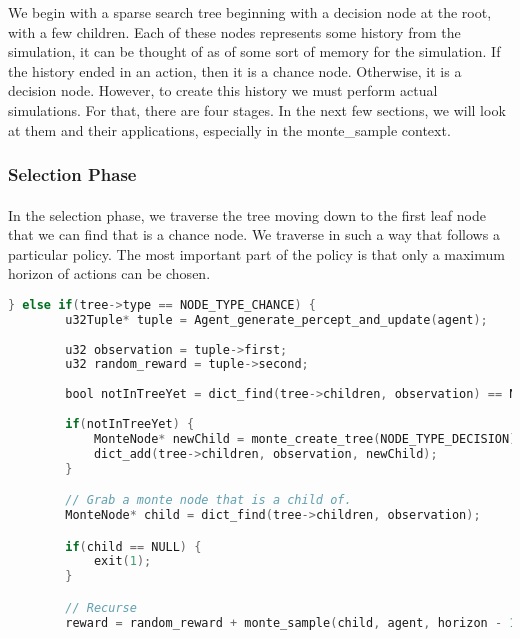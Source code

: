 \documentclass[fancychapters]{report}   	%
\begin{document}
We begin with a sparse search tree beginning with a decision node at the root, with a few children. Each of these nodes represents some history from the simulation, it can be thought of as of some sort of memory for the simulation. If the history ended in an action, then it is a chance node. Otherwise, it is a decision node. However, to create this history we must perform actual simulations. For that, there are four stages. In the next few sections, we will look at them and their applications, especially in the monte\_sample context.

\paragraph{}

\subsubsection{Selection Phase}

\paragraph{}In the selection phase, we traverse the tree moving down to the first leaf node that we can find that is a chance node. We traverse in such a way that follows a particular policy. The most important part of the policy is that only a maximum horizon of actions can be chosen.

\begin{lstlisting}[language=C, caption="Monte Sample"]
   } else if(tree->type == NODE_TYPE_CHANCE) {
        u32Tuple* tuple = Agent_generate_percept_and_update(agent);
	
        u32 observation = tuple->first;
        u32 random_reward = tuple->second;
        
        bool notInTreeYet = dict_find(tree->children, observation) == NULL;
	
        if(notInTreeYet) {
            MonteNode* newChild = monte_create_tree(NODE_TYPE_DECISION);
            dict_add(tree->children, observation, newChild);
        }

        // Grab a monte node that is a child of.
        MonteNode* child = dict_find(tree->children, observation);

        if(child == NULL) {
            exit(1);
        }

        // Recurse
        reward = random_reward + monte_sample(child, agent, horizon - 1);
\end{lstlisting}
\end{document}
